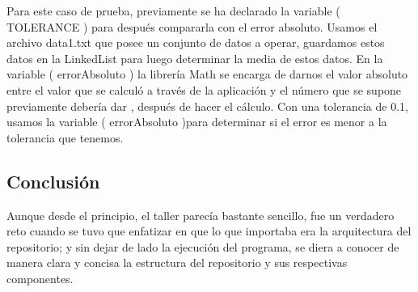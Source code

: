 \documentclass[
	12pt, %
	spanish, %
]{fphw}
\begin{document}
Para este caso de prueba, previamente se ha declarado la variable ( TOLERANCE ) para después compararla con el error absoluto.
Usamos el archivo data1.txt que posee un conjunto de datos a operar, guardamos estos datos en la LinkedList para luego determinar la media de estos datos.
En la variable ( errorAbsoluto ) la librería Math se encarga de darnos el valor absoluto entre el valor que se calculó a través de la aplicación y el número que se supone previamente debería dar , después de hacer el cálculo.
Con una tolerancia de 0.1, usamos la variable ( errorAbsoluto )para determinar si el error es menor a la tolerancia que tenemos.


\subsection*{Conclusión}

Aunque desde el principio, el taller parecía bastante sencillo, fue un verdadero reto cuando se tuvo que enfatizar en que lo que importaba era la arquitectura del repositorio; y sin dejar de lado la ejecución del programa, se diera a conocer de manera clara y concisa la estructura del repositorio y sus respectivas componentes.

\end{document}
